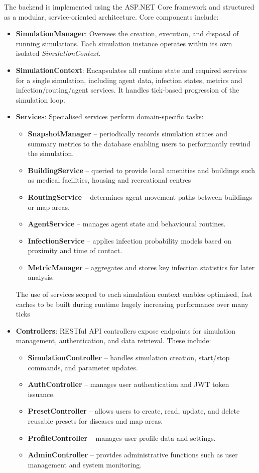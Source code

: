 The backend is implemented using the ASP.NET Core framework and structured as a modular, service-oriented architecture. Core components include:
\begin{itemize}
    \item \textbf{SimulationManager}: Oversees the creation, execution, and disposal of running simulations. Each simulation instance operates within its own isolated \textit{SimulationContext}.
    \item \textbf{SimulationContext}: Encapsulates all runtime state and required services for a single simulation, including agent data, infection states, metrics and infection/routing/agent services. It handles tick-based progression of the simulation loop.
    \item \textbf{Services}: Specialised services perform domain-specific tasks:
    \begin{itemize}
        \item \textbf{SnapshotManager} – periodically records simulation states and summary metrics to the database enabling users to performantly rewind the simulation.
        \item \textbf{BuildingService} – queried to provide local amenities and buildings such as medical facilities, housing and recreational centres
        \item \textbf{RoutingService} – determines agent movement paths between buildings or map areas.
        \item \textbf{AgentService} – manages agent state and behavioural routines.
        \item \textbf{InfectionService} – applies infection probability models based on proximity and time of contact.
        \item \textbf{MetricManager} – aggregates and stores key infection statistics for later analysis.
    \end{itemize}


    The use of services scoped to each simulation context enables optimised, fast caches to be built during runtime hugely increasing performance over many ticks
    \item \textbf{Controllers}: RESTful API controllers expose endpoints for simulation management, authentication, and data retrieval. These include:
    \begin{itemize}
        \item \textbf{SimulationController} – handles simulation creation, start/stop commands, and parameter updates.
        \item \textbf{AuthController} – manages user authentication and JWT token issuance.
        \item \textbf{PresetController} – allows users to create, read, update, and delete reusable presets for diseases and map areas.
        \item \textbf{ProfileController} – manages user profile data and settings.
        \item \textbf{AdminController} – provides administrative functions such as user management and system monitoring.
    \end{itemize}


\end{itemize}
